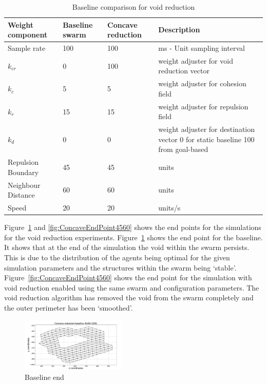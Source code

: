 \documentclass[preprint,12pt]{elsarticle}
\begin{document}
\begin{table}
\caption{Baseline comparison for void reduction} 
\label{tab:BaselineConcaveReduction3}
\begin{center}
\begin{tabular}{| p{1.4cm} | p{1.2cm} | p{1.2cm} | p{2.5cm} |}
\hline
\bf Weight \bf component & \bf Baseline \bf swarm & \bf Concave \bf reduction & \bf Description \\ \hline
Sample rate & 100 & 100 & ms - Unit sampling interval\\  \hline
$k_{cr}$ & 0 & 100 & weight adjuster for void reduction vector\\  \hline
$k_c$ & 5 & 5 & weight adjuster for cohesion field\\  \hline
$k_r$ & 15 & 15 & weight adjuster for repulsion field\\  \hline
$k_d$ & 0 & 0 & weight adjuster for destination vector 0 for static baseline 100 from goal-based\\  \hline
Repulsion Boundary & 45 & 45 & units\\  \hline
Neighbour Distance & 60 & 60 & units\\  \hline
Speed & 20 & 20 & units/s\\  \hline
\end{tabular}
\end{center}
\end{table}

Figure~\ref{fig:BaselineEndPoint4560} and \ref{fig:ConcaveEndPoint4560} shows the end points for the simulations for the void reduction experiments. Figure~\ref{fig:BaselineEndPoint4560} shows the end point for the baseline. It shows that at the end of the simulation the void within the swarm persists. This is due to the distribution of the agents being optimal for the given simulation parameters and the structures within the swarm being `stable'. Figure~\ref{fig:ConcaveEndPoint4560} shows the end point for the simulation with void reduction enabled using the same swarm and configuration parameters. The void reduction algorithm has removed the void from the swarm completely and the outer perimeter has been `smoothed'. 

\begin{figure}
\begin{center}
\includegraphics[width=5cm]{figures/Baseline4560End}
\end{center}
\caption{Baseline end\label{fig:BaselineEndPoint4560}}
\end{figure}
\end{document}
